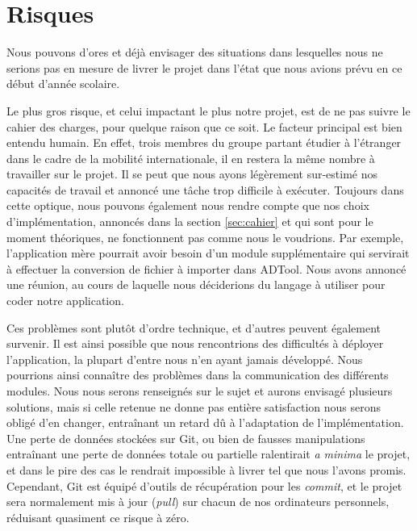 \section{Risques}
    Nous pouvons d'ores et déjà envisager des situations dans lesquelles nous ne serions pas en mesure de livrer le projet dans l'état que nous avions prévu en ce début d'année scolaire.

    Le plus gros risque, et celui impactant le plus notre projet, est de ne pas suivre le cahier des charges, pour quelque raison que ce soit.
    Le facteur principal est bien entendu humain. En effet, trois membres du groupe partant étudier à l'étranger dans le cadre de la mobilité internationale, il en restera la même nombre à travailler sur le projet. Il se peut que nous ayons légèrement sur-estimé nos capacités de travail et annoncé une tâche trop difficile à exécuter.
    Toujours dans cette optique, nous pouvons également nous rendre compte que nos choix d'implémentation, annoncés dans la section \ref{sec:cahier} et qui sont pour le moment théoriques, ne fonctionnent pas comme nous le voudrions. Par exemple, l'application mère pourrait avoir besoin d'un module supplémentaire qui servirait à effectuer la conversion de fichier à importer dans ADTool. Nous avons annoncé une réunion, au cours de laquelle nous déciderions du langage à utiliser pour coder notre application.
    
    Ces problèmes sont plutôt d'ordre technique, et d'autres peuvent également survenir. Il est ainsi possible que nous rencontrions des difficultés à déployer l'application, la plupart d'entre nous n'en ayant jamais développé. Nous pourrions ainsi connaître des problèmes dans la communication des différents modules. Nous nous serons renseignés sur le sujet et aurons envisagé plusieurs solutions, mais si celle retenue ne donne pas entière satisfaction nous serons obligé d'en changer, entraînant un retard dû à l'adaptation de l'implémentation.
    Une perte de données stockées sur Git, ou bien de fausses manipulations entraînant une perte de données totale ou partielle ralentirait \textit{a minima} le projet, et dans le pire des cas le rendrait impossible à livrer tel que nous l'avons promis. Cependant, Git est équipé d'outils de récupération pour les \textit{commit}, et le projet sera normalement mis à jour (\textit{pull}) sur chacun de nos ordinateurs personnels, réduisant quasiment ce risque à zéro.

